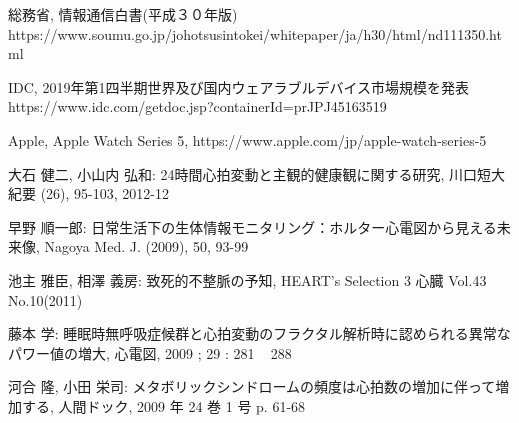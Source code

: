 \documentclass[report, 11pt, a4paper]{jsbook}
\begin{document}
\newpage
\begin{thebibliography}{20}
   総務省, 情報通信白書(平成３０年版)\\ https://www.soumu.go.jp/johotsusintokei/whitepaper/ja/h30/html/nd111350.html
  
   IDC, 2019年第1四半期世界及び国内ウェアラブルデバイス市場規模を発表 https://www.idc.com/getdoc.jsp?containerId=prJPJ45163519
  
   Apple, Apple Watch Series 5, https://www.apple.com/jp/apple-watch-series-5
  
   大石 健二, 小山内 弘和: 24時間心拍変動と主観的健康観に関する研究, 川口短大紀要 (26), 95-103, 2012-12
  
   早野 順一郎: 日常生活下の生体情報モニタリング：ホルター心電図から見える未来像, Nagoya Med. J. (2009), 50, 93-99
  
   池主 雅臣,  相澤 義房: 致死的不整脈の予知, HEART's Selection 3 心臓 Vol.43 No.10(2011)
  
   藤本 学: 睡眠時無呼吸症候群と心拍変動のフラクタル解析時に認められる異常なパワー値の増大, 心電図, 2009 ; 29 : 281 ~ 288
  
   河合 隆, 小田 栄司: メタボリックシンドロームの頻度は心拍数の増加に伴って増加する, 人間ドック, 2009 年 24 巻 1 号 p. 61-68
  
\end{thebibliography}
\end{document}
